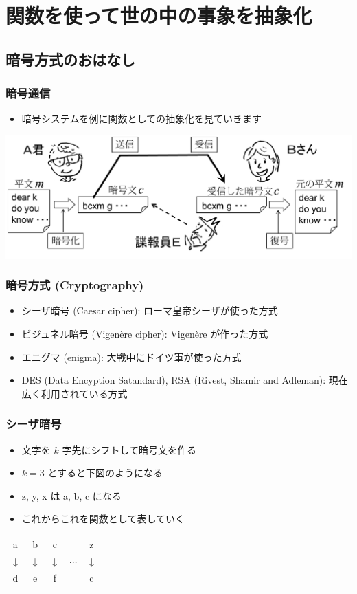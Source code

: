 \section{関数を使って世の中の事象を抽象化}
\subsection{暗号方式のおはなし}
\begin{frame}[fragile]
\frametitle{暗号通信}
  \begin{itemize}
\item 暗号システムを例に関数としての抽象化を見ていきます
  \end{itemize}
  \begin{center}
\includegraphics[scale=0.3]{./Figure/elementaryCS-figAliceBob.pdf}
  \end{center}
\end{frame}
\begin{frame}[fragile]
\frametitle{暗号方式 (Cryptography)}
  \begin{itemize}
\item シーザ暗号 (Caesar cipher): ローマ皇帝シーザが使った方式
\item ビジュネル暗号 (Vigen\`{e}re cipher): Vigen\`{e}re が作った方式
\item エニグマ (enigma): 大戦中にドイツ軍が使った方式
\item DES (Data Encyption Satandard), RSA (Rivest, Shamir and Adleman): 現在広く利用されている方式
  \end{itemize}
\end{frame}
\begin{frame}[fragile]
\frametitle{シーザ暗号}
  \begin{itemize}
\item 文字を $k$ 字先にシフトして暗号文を作る
\item \(k=3\) とすると下図のようになる
\item z, y, x は a, b, c になる
\item これからこれを関数として表していく
  \end{itemize}
  \begin{center}
    \begin{tabular}{ccccc}
a & b & c && z\\
$\downarrow$&$\downarrow$&$\downarrow$&$\cdots$&$\downarrow$\\
d & e & f && c
    \end{tabular}
  \end{center}
\end{frame}
